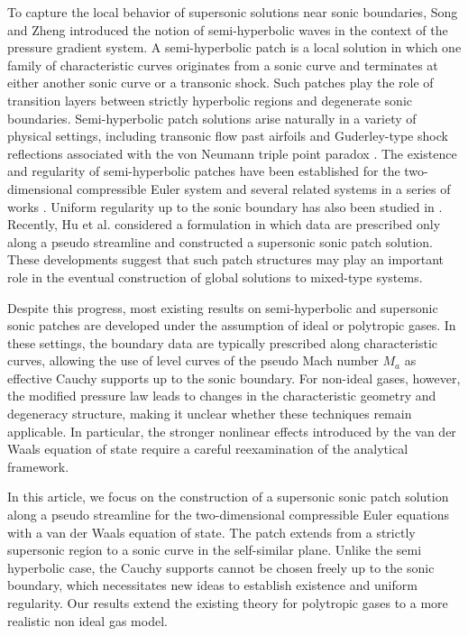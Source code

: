 \documentclass[3p,11pt]{elsarticle}
\numberwithin{equation}{section}
\begin{document}
To capture the local behavior of supersonic solutions near sonic boundaries, Song and Zheng \cite{songzheng2009} introduced the notion of semi-hyperbolic waves in the context of the pressure gradient system. A semi-hyperbolic patch is a local solution in which one family of characteristic curves originates from a sonic curve and terminates at either another sonic curve or a transonic shock. Such patches play the role of transition layers between strictly hyperbolic regions and degenerate sonic boundaries. Semi-hyperbolic patch solutions arise naturally in a variety of physical settings, including transonic flow past airfoils \cite{Courant1948} and Guderley-type shock reflections associated with the von Neumann triple point paradox \cite{Tesdall2006, Tesdall2008}. The existence and regularity of semi-hyperbolic patches have been established for the two-dimensional compressible Euler system and several related systems in a series of works \cite{LMingjie2011, yanbohu2014, lgeng2015, Yongqiang2023}. Uniform regularity up to the sonic boundary has also been studied in \cite{yanbohu2018, chenj2020, CJianjun2025, Rahul4}. Recently, Hu et al. \cite{hu2024supersonic} considered a formulation in which data are prescribed only along a pseudo streamline and constructed a supersonic sonic patch solution. These developments suggest that such patch structures may play an important role in the eventual construction of global solutions to mixed-type systems.

Despite this progress, most existing results on semi-hyperbolic and supersonic sonic patches are developed under the assumption of ideal or polytropic gases. In these settings, the boundary data are typically prescribed along characteristic curves, allowing the use of level curves of the pseudo Mach number $M_a$ as effective Cauchy supports up to the sonic boundary. For non-ideal gases, however, the modified pressure law leads to changes in the characteristic geometry and degeneracy structure, making it unclear whether these techniques remain applicable. In particular, the stronger nonlinear effects introduced by the van der Waals equation of state require a careful reexamination of the analytical framework.

In this article, we focus on the construction of a supersonic sonic patch solution along a pseudo streamline for the two-dimensional compressible Euler equations with a van der Waals equation of state. The patch extends from a strictly supersonic region to a sonic curve in the self-similar plane. Unlike the semi hyperbolic case, the Cauchy supports cannot be chosen freely up to the sonic boundary, which necessitates new ideas to establish existence and uniform regularity. Our results extend the existing theory for polytropic gases to a more realistic non ideal gas model.
\end{document}
